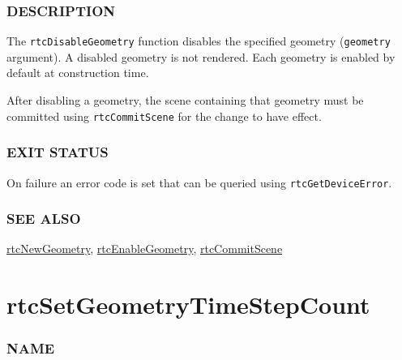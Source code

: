 \begin{Shaded}
\begin{Highlighting}[]

\OperatorTok{(}\OperatorTok{);}
\end{Highlighting}
\end{Shaded}

\subsubsection{DESCRIPTION}\label{description}

The \texttt{rtcDisableGeometry} function disables the specified geometry
(\texttt{geometry} argument). A disabled geometry is not rendered. Each
geometry is enabled by default at construction time.

After disabling a geometry, the scene containing that geometry must be
committed using \texttt{rtcCommitScene} for the change to have effect.

\subsubsection{EXIT STATUS}\label{exit-status}

On failure an error code is set that can be queried using
\texttt{rtcGetDeviceError}.

\subsubsection{SEE ALSO}\label{see-also}

\hyperref[rtcnewgeometry]{rtcNewGeometry},
\hyperref[rtcenablegeometry]{rtcEnableGeometry},
\hyperref[rtccommitscene]{rtcCommitScene}

\pagebreak

\section{rtcSetGeometryTimeStepCount}\label{rtcsetgeometrytimestepcount}

\subsubsection{NAME}\label{name}

\begin{Shaded}
\begin{Highlighting}[]
\OperatorTok{{-}}
\end{Highlighting}
\end{Shaded}

